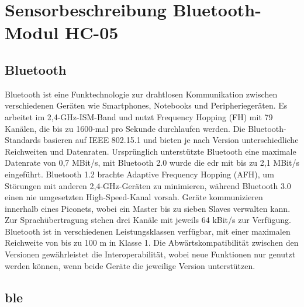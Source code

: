 %
%

\chapter{Sensorbeschreibung Bluetooth-Modul HC-05}\label{Bluetoothmodul HC-05}


\section{Bluetooth}

Bluetooth ist eine Funktechnologie zur drahtlosen Kommunikation zwischen verschiedenen Geräten wie Smartphones, Notebooks und Peripheriegeräten. Es arbeitet im 2,4-GHz-ISM-Band und nutzt Frequency Hopping (FH) mit 79 Kanälen, die bis zu 1600-mal pro Sekunde durchlaufen werden. Die Bluetooth-Standards basieren auf IEEE 802.15.1 und bieten je nach Version unterschiedliche Reichweiten und Datenraten. Ursprünglich unterstützte Bluetooth eine maximale Datenrate von 0,7 MBit/s, mit Bluetooth 2.0 wurde die \ac{edr} mit bis zu 2,1 MBit/s eingeführt. Bluetooth 1.2 brachte Adaptive Frequency Hopping (AFH), um Störungen mit anderen 2,4-GHz-Geräten zu minimieren, während Bluetooth 3.0 einen nie umgesetzten High-Speed-Kanal vorsah. Geräte kommunizieren innerhalb eines Piconets, wobei ein Master bis zu sieben Slaves verwalten kann. Zur Sprachübertragung stehen drei Kanäle mit jeweils 64 kBit/s zur Verfügung. Bluetooth ist in verschiedenen Leistungsklassen verfügbar, mit einer maximalen Reichweite von bis zu 100 m in Klasse 1. Die Abwärtskompatibilität zwischen den Versionen gewährleistet die Interoperabilität, wobei neue Funktionen nur genutzt werden können, wenn beide Geräte die jeweilige Version unterstützen. \cite{Dembowski:2013,IEEE:2005}

\section{\ac{ble}}

